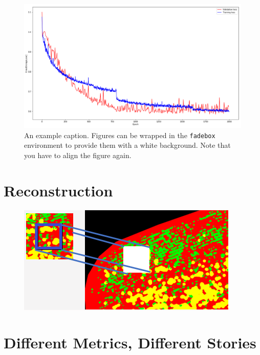 \documentclass[
]{dtuposter}
\begin{document}
\begin{dtupostercontent}
\begin{figure}
	\begin{fadebox}\begin{center}
			\includegraphics[width=\linewidth,origin=c]{loss}
	\end{center}\end{fadebox}
	\caption{An example caption. Figures can be wrapped in the \texttt{fadebox} 
		environment to provide them with a white background. Note that you have to align the 
		figure again.}\label{fig:example2}
\end{figure}

\section{Reconstruction}
\begin{figure}
	\centering
	\includegraphics[width=0.7\linewidth]{"Reconstruction DL"}
	\caption{}
	\label{fig:reconstruction-dl}
\end{figure}

\section{Different Metrics, Different Stories}

\begin{table}
	\begin{tabular}{c|ccc|ccc|}
		

\end{tabular}
\end{table}
\end{dtupostercontent}
\end{document}
